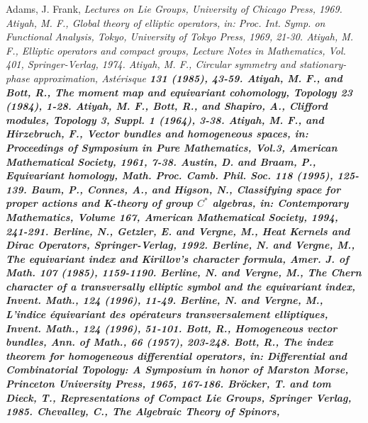 \documentclass[a4paper,a4paper]{article}
\theoremstyle{conjecture}
\begin{document}
\begin{thebibliography}{99}
\rm Adams, J. Frank, \it Lectures on Lie Groups, \rm University of
Chicago Press, 1969.
\rm Atiyah, M. F.,
\rm Global theory of elliptic operators, in:
\it Proc. Int. Symp. on Functional Analysis, Tokyo,
\rm University of Tokyo Press, 1969, 21-30.
\rm Atiyah, M. F.,
\rm Elliptic operators and compact groups,
\it Lecture Notes in Mathematics, Vol. 401,
\rm Springer-Verlag, 1974.
\rm Atiyah, M. F.,
\rm Circular symmetry and stationary-phase approximation,
\it Ast\'erisque \bf 131
\rm (1985), 43-59.
\rm Atiyah, M. F., and Bott, R.,
\rm The moment map and equivariant cohomology,
\it Topology \bf 23
\rm (1984), 1-28.
\rm Atiyah, M. F., Bott, R., and Shapiro, A., \rm Clifford modules,
\it Topology \bf 3, Suppl. 1 \rm (1964), 3-38.
\rm Atiyah, M. F., and Hirzebruch, F.,
\rm Vector bundles and homogeneous spaces, in:
\it Proceedings of Symposium in Pure Mathematics, Vol.3,
\rm American Mathematical Society, 1961, 7-38.
\rm Austin, D. and Braam, P.,
\rm Equivariant homology,
\it Math. Proc. Camb. Phil. Soc.
\bf 118
\rm (1995), 125-139.
\rm Baum, P., Connes, A., and Higson, N.,
\rm Classifying space for proper actions and K-theory of group $C^*$ algebras, in:
\it Contemporary Mathematics, Volume 167,
\rm American Mathematical Society, 1994, 241-291.
\rm Berline, N., Getzler, E. and Vergne, M.,
\it Heat Kernels and
Dirac Operators, \rm Springer-Verlag, 1992.
\rm Berline, N. and Vergne, M.,
\rm The equivariant index and Kirillov's character formula,
\it Amer. J. of Math.
\bf 107
\rm (1985), 1159-1190.
\rm Berline, N. and Vergne, M.,
\rm The Chern character of a transversally elliptic symbol and the equivariant index,
\it Invent. Math.,
\bf 124
\rm (1996), 11-49.
\rm Berline, N. and Vergne, M.,
\rm L'indice \'equivariant des op\'erateurs transversalement elliptiques,
\it Invent. Math.,
\bf 124
\rm (1996), 51-101.
\rm Bott, R.,
\rm Homogeneous vector bundles,
\it Ann. of Math.,
\bf 66
\rm (1957), 203-248.
\rm Bott, R.,
\rm The index theorem for homogeneous differential operators, in:
\it Differential and Combinatorial Topology: A Symposium in honor
of Marston Morse,
\rm Princeton University Press, 1965, 167-186.
Br\"ocker, T. and tom Dieck, T.,
\it Representations of Compact Lie Groups,
\rm Springer Verlag, 1985.
\rm Chevalley, C., \it The Algebraic Theory of Spinors, \rm

\end{thebibliography}
\end{document}
